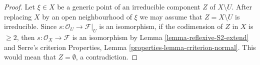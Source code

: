 \documentclass[10pt,a4paper]{amsart}
\theoremstyle{plain}
\theoremstyle{definition}
\theoremstyle{remark}
\numberwithin{equation}{subsection}
\begin{document}
\begin{proof}
Let $\xi \in X$ be a generic point of an irreducible component $Z$ of
$X \setminus U$. After replacing $X$ by an open neighbourhood of
$\xi$ we may assume that $Z = X \setminus U$ is irreducible. Since
$s : \mathcal{O}_U \to \mathcal{F}|_U$ is an isomorphism, if
the codimension of $Z$ in $X$ is $\geq 2$, then
$s : \mathcal{O}_X \to \mathcal{F}$ is an isomorphism by
Lemma \ref{lemma-reflexive-S2-extend} and Serre's criterion
Properties, Lemma \ref{properties-lemma-criterion-normal}.
This would mean that $Z = \emptyset$, a contradiction.
\end{proof}
\end{document}
